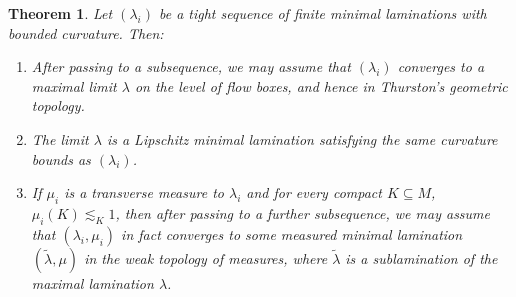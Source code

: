 \documentclass[reqno,11pt]{amsart}
\newtheorem{theorem}{Theorem}[section]
\theoremstyle{definition}
\numberwithin{equation}{section}
\begin{document}
\begin{theorem}\label{compactness in flow boxes and Thurston}
Let $(\lambda_i)$ be a tight sequence of finite minimal laminations with bounded curvature. Then:
\begin{enumerate}
\item After passing to a subsequence, we may assume that $(\lambda_i)$ converges to a maximal limit $\lambda$ on the level of flow boxes, and hence in Thurston's geometric topology.
\item The limit $\lambda$ is a Lipschitz minimal lamination satisfying the same curvature bounds as $(\lambda_i)$.
\item If $\mu_i$ is a transverse measure to $\lambda_i$ and for every compact $K \subseteq M$, $\mu_i(K) \lesssim_K 1$, then after passing to a further subsequence, we may assume that $(\lambda_i, \mu_i)$ in fact converges to some measured minimal lamination $(\tilde \lambda, \mu)$ in the weak topology of measures, where $\tilde \lambda$ is a sublamination of the maximal lamination $\lambda$.
\end{enumerate}
\end{theorem}
\end{document}
